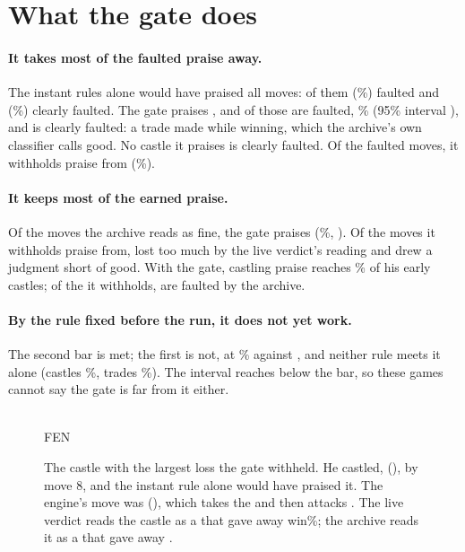 \documentclass[11pt]{article}
\begin{document}
\section{What the gate does}

\GateTable

\paragraph{It takes most of the faulted praise away.} The instant rules alone would have praised
all \Moves{} moves: \FaultedAll{} of them (\FaultedAllPct\%) faulted and \ClearAll{}
(\ClearAllPct\%) clearly faulted. The gate praises \Praised, and \FaultedPraised{} of those are
faulted, \FaultedPraisedPct\% (95\% interval \FaultedPraisedCI), and \ClearPraised{} is clearly
faulted: a trade made while winning, which the archive's own classifier calls good. No castle it
praises is clearly faulted. Of the \FaultedAll{} faulted moves, it withholds praise from
\Caught{} (\CaughtPct\%).

\paragraph{It keeps most of the earned praise.} Of the \Fine{} moves the archive reads as fine,
the gate praises \FinePraised{} (\FinePraisedPct\%, \FinePraisedCI). Of the \Withheld{} moves it
withholds praise from, \WithheldLoss{} lost too much by the live verdict's reading and
\WithheldJudgment{} drew a judgment short of good. With the gate, castling praise reaches
\CastlesPraisedPct\% of his early castles; of the \CastlesWithheld{} it withholds, \CastlesWithheldFaulted{} are
faulted by the archive.

\paragraph{By the rule fixed before the run, it does not yet work.} The second bar is met; the
first is not, at \FaultedPraisedPct\% against \RuleFaulted, and neither rule meets it alone
(castles \CastlesFaultedPct\%, trades \TradesFaultedPct\%). The interval reaches below the bar, so
these games cannot say the gate is far from it either.

\begin{figure}[ht]
\centering
\ExBoard\\[0.4em]
{\footnotesize FEN \ExFen}
\caption{The castle with the largest loss the gate withheld. He castled, \ExPlayed{}
(\ExPlayedUci), by move 8, and the instant rule alone would have praised it. The engine's move
was \ExBetter{} (\ExBetterUci), which takes the \ExTaken{} and then attacks \ExTargets. The live
verdict reads the castle as a \ExJudgment{} that gave away \ExLive{} win\%; the archive reads it
as a \ExClass{} that gave away \ExArchive.}
\label{fig:example}
\end{figure}
\end{document}
